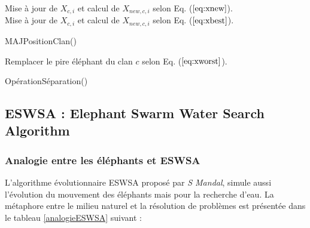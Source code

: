 \begin{function}[H]	
	\vspace{-0.2cm}		
	\xdash[13.5cm]
	
	\SetAlgoLined
	\DontPrintSemicolon
	
	
	\For{ \c $\gets$ 1 \KwTo \nClan}
	{
		\vspace{0.1cm}
		{
			Mise à jour de $X_{c,i}$ et calcul de $X_{new,c,i}$ selon Eq. ($\ref{eq:xnew}$).\\
			\vspace{0.1cm}
			{
				Mise à jour de $X_{c,i}$ et calcul de $X_{new,c,i}$ selon Eq. ($\ref{eq:xbest}$).
			}
		}			
	}
	
	\caption{MAJPositionClan()}
\end{function}
\vspace{0.1cm}
\begin{function}[H]
	\vspace{-0.2cm}		
	\xdash[13.5cm]
	
	\SetAlgoLined
	\DontPrintSemicolon
	
	
	\For{ \c $\gets$ 1 \KwTo \nClan}
	{
		Remplacer le pire éléphant du clan $c$ selon Eq. ($\ref{eq:xworst}$).
	}
	\caption{OpérationSéparation()}
\end{function}












\subsection{ESWSA : Elephant Swarm Water Search Algorithm}
\subsubsection{Analogie entre les éléphants et ESWSA \cite{EHO1}}
L'algorithme évolutionnaire ESWSA proposé par \textit{S Mandal}, simule aussi l'évolution du
mouvement des éléphants mais pour la recherche d'eau. La métaphore entre le milieu
naturel et la résolution de problèmes est présentée dans le tableau \ref{analogieESWSA} suivant :


